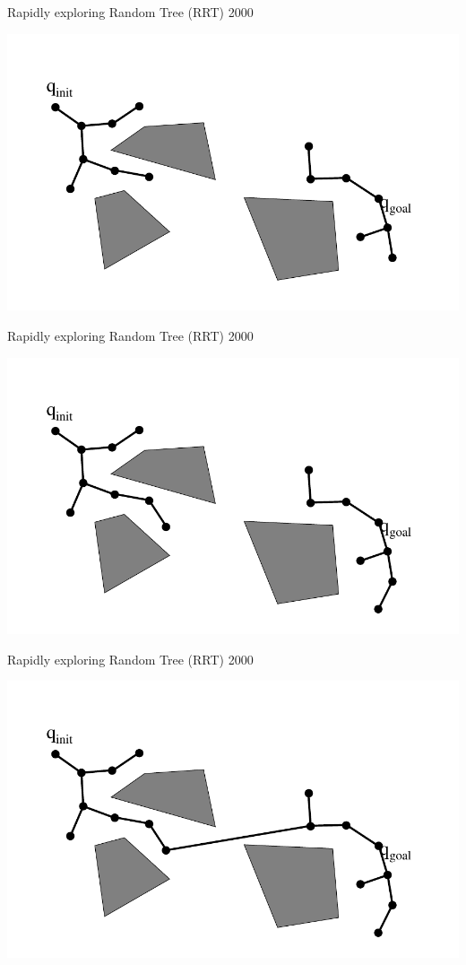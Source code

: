 \begin{frame} {Rapidly exploring Random Tree (RRT) 2000}
\centerline {
  \includegraphics[width=.8\linewidth]{figures/RRT18.pdf}
}
\end{frame}

\begin{frame} {Rapidly exploring Random Tree (RRT) 2000}
\centerline {
  \includegraphics[width=.8\linewidth]{figures/RRT19.pdf}
}
\end{frame}

\begin{frame} {Rapidly exploring Random Tree (RRT) 2000}
\centerline {
  \includegraphics[width=.8\linewidth]{figures/RRT20.pdf}
}
\end{frame}

